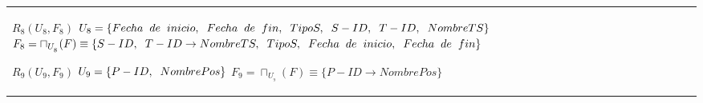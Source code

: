 \documentclass{report}
\begin{document}
\begin{tabularx}{\textwidth}{|X|}
        $ R_{8} ( U_{8} , F_{8} ) $ \newline 
        $ U_{8} = \{{Fecha \hspace{0.2cm} de \hspace{0.2cm} inicio, \hspace{0.2cm}  Fecha \hspace{0.2cm} de \hspace{0.2cm} fin, \hspace{0.2cm}  TipoS, \hspace{0.2cm}  S-ID, \hspace{0.2cm}  T-ID, \hspace{0.2cm}  NombreTS}\} $ \newline 
        $ F_{8} = \sqcap_{U_{_{8}}}(F) \equiv \{S-ID, \hspace{0.2cm} T-ID \rightarrow NombreTS, \hspace{0.2cm} TipoS, \hspace{0.2cm} Fecha \hspace{0.2cm} de \hspace{0.2cm} inicio, \hspace{0.2cm} Fecha \hspace{0.2cm} de \hspace{0.2cm} fin \} $\newline 
        
        $ R_{9} ( U_{9} , F_{9} ) $ \newline 
        $ U_{9} = \{{P-ID, \hspace{0.2cm}  NombrePos}\} $ \newline 
        $ F_{9} = \sqcap_{U_{_{9}}}(F) \equiv \{P-ID \rightarrow NombrePos \} $\newline 
        

\end{tabularx}
\end{document}
